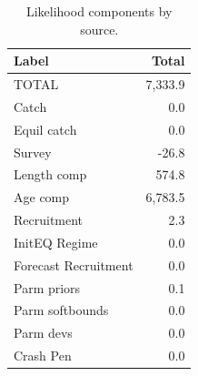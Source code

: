 \documentclass[
]{scrartcl}
\begin{document}
\begin{longtable}{lr}

\caption{\label{tbl-likes}Likelihood components by source.}

\tabularnewline

\toprule
Label & Total \\ 
\midrule\addlinespace[2.5pt]
TOTAL & 7,333.9 \\ 
Catch & 0.0 \\ 
Equil catch & 0.0 \\ 
Survey & -26.8 \\ 
Length comp & 574.8 \\ 
Age comp & 6,783.5 \\ 
Recruitment & 2.3 \\ 
InitEQ Regime & 0.0 \\ 
Forecast Recruitment & 0.0 \\ 
Parm priors & 0.1 \\ 
Parm softbounds & 0.0 \\ 
Parm devs & 0.0 \\ 
Crash Pen & 0.0 \\ 
\bottomrule

\end{longtable}

\endgroup

\newpage{}

\begingroup
\fontsize{9.0pt}{10.8pt}\selectfont
\end{document}
